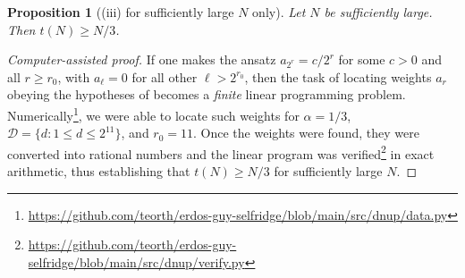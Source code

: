 \documentclass[12pt,a4paper,reqno]{amsart}
\numberwithin{equation}{section}
\theoremstyle{plain}
\newtheorem{proposition}[theorem]{Proposition}
\theoremstyle{definition}
\begin{document}
\begin{proposition}[(iii) for sufficiently large $N$ only] \label{onethird-large} Let $N$ be sufficiently large.  Then $t(N) \ge N/3$.
\end{proposition}
\begin{proof}[Computer-assisted proof]
If one makes the ansatz $a_{2^r} = c / 2^r$ for some $c>0$ and all $r \geq r_0$, with $a_\ell = 0$ for all other $\ell > 2^{r_0}$, then the task of locating weights $a_r$ obeying the hypotheses of  becomes a \emph{finite} linear programming problem.  
Numerically\footnote{\url{https://github.com/teorth/erdos-guy-selfridge/blob/main/src/dnup/data.py}}, we were able to locate such weights for $\alpha=1/3$, ${\mathcal D} = \{d: 1 \leq d \leq 2^{11}\}$, and $r_0=11$.
Once the weights were found, they were converted into rational numbers and the linear program was verified\footnote{\url{https://github.com/teorth/erdos-guy-selfridge/blob/main/src/dnup/verify.py}} in exact arithmetic, thus establishing that $t(N) \geq N/3$ for sufficiently large $N$.
\end{proof}
\end{document}
